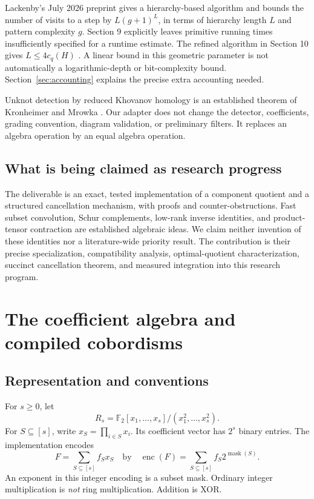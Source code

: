\documentclass[11pt]{article}
\theoremstyle{definition}\newtheorem{definition}[theorem]{Definition}
\theoremstyle{remark}\newtheorem{remark}[theorem]{Remark}
\newcommand{\F}{\mathbb F_2}
\begin{document}
Lackenby's July 2026 preprint gives a hierarchy-based algorithm and bounds the number of visits to a step by $L(g+1)^L$, in terms of hierarchy length $L$ and pattern complexity $g$. Section 9 explicitly leaves primitive running times insufficiently specified for a runtime estimate. The refined algorithm in Section 10 gives $L\leq4c_q(H)$ \cite[Propositions 9.1 and 10.2]{lackenby}. A linear bound in this geometric parameter is not automatically a logarithmic-depth or bit-complexity bound. Section~\ref{sec:accounting} explains the precise extra accounting needed.

Unknot detection by reduced Khovanov homology is an established theorem of Kronheimer and Mrowka \cite{km}. Our adapter does not change the detector, coefficients, grading convention, diagram validation, or preliminary filters. It replaces an algebra operation by an equal algebra operation.

\subsection{What is being claimed as research progress}
The deliverable is an exact, tested implementation of a component quotient and a structured cancellation mechanism, with proofs and counter-obstructions. Fast subset convolution, Schur complements, low-rank inverse identities, and product-tensor contraction are established algebraic ideas. We claim neither invention of these identities nor a literature-wide priority result. The contribution is their precise specialization, compatibility analysis, optimal-quotient characterization, succinct cancellation theorem, and measured integration into this research program.

\section{The coefficient algebra and compiled cobordisms}
\label{sec:algebra}
\subsection{Representation and conventions}
For $s\geq0$, let
\begin{equation}\label{eq:ring}
 R_s=\F[x_1,\ldots,x_s]/(x_1^2,\ldots,x_s^2).
\end{equation}
For $S\subseteq[s]$, write $x_S=\prod_{i\in S}x_i$. Its coefficient vector has $2^s$ binary entries. The implementation encodes
\[
 F=\sum_{S\subseteq[s]} f_Sx_S
 \quad\text{by}\quad
 \operatorname{enc}(F)=\sum_{S\subseteq[s]} f_S2^{\operatorname{mask}(S)}.
\]
An exponent in this integer encoding is a subset mask. Ordinary integer multiplication is \emph{not} ring multiplication. Addition is XOR.
\end{document}
